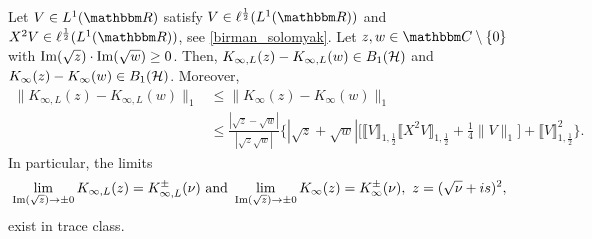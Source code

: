 \begin{lemma}\label{bso03t} 
Let $V\in L^1(\R)$ satisfy $V\in\ell^{\frac{1}{2}}(L^1(\R))$ and $X^2V\in\ell^{\frac{1}{2}}(L^1(\R))$, see \eqref{birman_solomyak}.
Let $z,w\in\C\setminus\{0\}$ with $\operatorname{Im}(\sqrt{z})\cdot\operatorname{Im}(\sqrt{w})\geq 0$.
Then, $K_{\infty,L}(z)-K_{\infty,L}(w)\in B_1({\mathcal H})$ and
$K_\infty(z)-K_\infty(w)\in B_1({\mathcal H})$. Moreover,
\begin{equation}\label{bso03t01}
\begin{split}
    \| K_{\infty,L}(z)-K_{\infty,L}(w)\|_1
     & \leq \| K_\infty(z)-K_\infty(w)\|_1\\
     & \leq \frac{|\sqrt{z}-\sqrt{w}|}{|\sqrt{z}\sqrt{w}|} \Big\{ 
              |\sqrt{z}+\sqrt{w}|\Big[ \llbracket V\rrbracket_{1,\frac{1}{2}} \llbracket X^2V\rrbracket_{1,\frac{1}{2}} + \frac14 \|V\|_1 \Big]
                    + \llbracket V\rrbracket_{1,\frac{1}{2}}^2 \Big\} .
\end{split}
\end{equation}
In particular, the limits
\begin{equation*}
  \lim\limits_{\im(\sqrt{z})\to\pm 0} K_{\infty,L}(z) = K_{\infty,L}^\pm(\nu)\ \text{and}\
  \lim\limits_{\im(\sqrt{z})\to\pm 0} K_\infty(z) = K_\infty^\pm(\nu),\ z=(\sqrt{\nu}+is)^2,
\end{equation*}
exist in trace class. 
\end{lemma}
